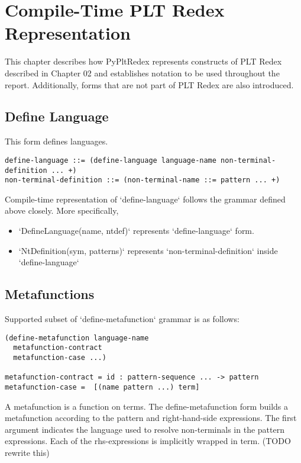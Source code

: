 \chapter{Compile-Time PLT Redex Representation}

This chapter describes how PyPltRedex represents constructs of PLT Redex described in Chapter 02 and establishes notation to be used throughout the report. Additionally, forms that are not part of PLT Redex are also introduced.

\section{Define Language}

This form defines languages.

\begin{lstlisting}
define-language ::= (define-language language-name non-terminal-definition ... +)
non-terminal-definition ::= (non-terminal-name ::= pattern ... +)
\end{lstlisting}


Compile-time representation of `define-language` follows the grammar defined above closely. More specifically, 

\begin{itemize}
\item
`DefineLanguage(name, ntdef)` represents `define-language` form. 
\item
`NtDefinition(sym, patterns)` represents `non-terminal-definition` inside `define-language`
\end{itemize}

\section{Metafunctions}
Supported subset of `define-metafunction` grammar is as follows:

\begin{lstlisting}
(define-metafunction language-name
  metafunction-contract
  metafunction-case ...)

metafunction-contract =	id : pattern-sequence ... -> pattern 
metafunction-case =  [(name pattern ...) term] 
\end{lstlisting}

A metafunction is a function on terms. The define-metafunction form builds a metafunction according to the pattern and right-hand-side expressions. The first argument indicates the language used to resolve non-terminals in the pattern expressions. Each of the rhs-expressions is implicitly wrapped in term. (TODO rewrite this)

